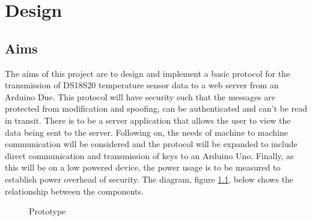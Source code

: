 
\chapter{Design}
\label{design}

\section{Aims}

The aims of this project are to design and implement a basic protocol for the transmission of DS18S20 temperature sensor data to a web server from an Arduino Due. This protocol will have security such that the messages are protected from modification and spoofing, can be authenticated and can't be read in transit. There is to be a server application that allows the user to view the data being sent to the server.
Following on, the needs of machine to machine communication will be considered and the protocol will be expanded to include direct communication and transmission of keys to an Arduino Uno. Finally, as this will be on a low powered device, the power usage is to be measured to establish power overhead of security. The diagram, figure \ref{dia:node}, below shows the relationship between the components.


\begin{figure}[H]
\centering
{}
\caption{Prototype}
\label{dia:node}
\end{figure}


